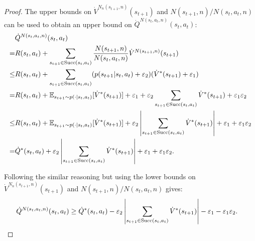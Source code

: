 \begin{proof}
            The upper bounds on $\dot{V}^{N_n(s_{t+1},n)}(s_{t+1})$ and $N(s_{t+1},n)/N(s_t,a_t,n)$ can be used to obtain an upper bound on $\dot{Q}^{N(s_t,a_t,n)}(s_t,a_t)$: 
            \begin{align}
                &\dot{Q}^{N(s_t,a_t,n)}(s_t,a_t) \\
                    =& R(s_t,a_t) 
                        + \sum_{s_{t+1}\in{\textnormal{Succ}(s_t,a_t)}}\frac{N(s_{t+1},n)}{N(s_t,a_t,n)} 
                            \dot{V}^{N(s_{t+1},n)}(s_{t+1}) \\
                    \leq& R(s_t,a_t) 
                        + \sum_{s_{t+1}\in{\textnormal{Succ}(s_t,a_t)}}(p(s_{t+1}|s_t,a_t)+\varepsilon_2)
                            (\dot{V}^*(s_{t+1})+\varepsilon_1) \\
                    =& R(s_t,a_t) 
                        + \mathbb{E}_{s_{t+1}\sim p(\cdot|s_t,a_t)}[\dot{V}^*(s_{t+1})] 
                        + \varepsilon_1 
                        + \varepsilon_2\sum_{s_{t+1}\in{\textnormal{Succ}(s_t,a_t)}} \dot{V}^*(s_{t+1}) 
                        + \varepsilon_1 \varepsilon_2 \\
                    \leq& R(s_t,a_t) 
                        + \mathbb{E}_{s_{t+1}\sim p(\cdot|s_t,a_t)}[\dot{V}^*(s_{t+1})] 
                        + \varepsilon_2\left|\sum_{s_{t+1}\in{\textnormal{Succ}(s_t,a_t)}} \dot{V}^*(s_{t+1})\right| 
                        + \varepsilon_1 + \varepsilon_1 \varepsilon_2 \\
                    =& \dot{Q}^*(s_t,a_t) 
                        + \varepsilon_2\left|\sum_{s_{t+1}\in{\textnormal{Succ}(s_t,a_t)}} \dot{V}^*(s_{t+1})\right| 
                        + \varepsilon_1 
                        + \varepsilon_1 \varepsilon_2.
            \end{align}
            
            Following the similar reasoning but using the lower bounds on $\dot{V}^{N_n(s_{t+1},n)}(s_{t+1})$ and $N(s_{t+1},n)/N(s_t,a_t,n)$ gives: 
            \begin{align}
                \dot{Q}^{N(s_t,a_t,n)}(s_t,a_t) 
                    &\geq \dot{Q}^*(s_t,a_t) 
                        - \varepsilon_2\left|\sum_{s_{t+1}\in{\textnormal{Succ}(s_t,a_t)}} \dot{V}^*(s_{t+1})\right| 
                        - \varepsilon_1 
                        - \varepsilon_1 \varepsilon_2.
            \end{align}
            

\end{proof}
